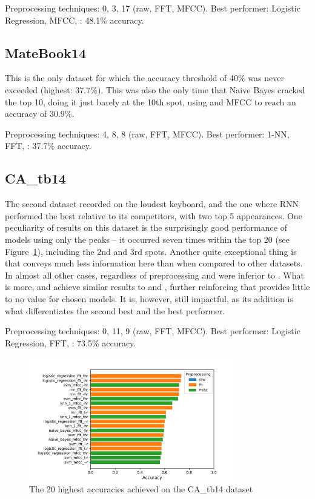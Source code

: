 \documentclass[../main.tex]{subfiles}
\begin{document}
Preprocessing techniques: 0, 3, 17 (raw, FFT, MFCC).
Best performer: Logistic Regression, MFCC, : 48.1\% accuracy.
%
\subsection{MateBook14}
This is the only dataset for which the accuracy threshold of 40\% was never exceeded (highest: 37.7\%).
This was also the only time that Naive Bayes cracked the top 10, doing it just barely at the 10th spot, using  and MFCC to reach an accuracy of 30.9\%. 

Preprocessing techniques: 4, 8, 8 (raw, FFT, MFCC).
Best performer: 1-NN, FFT, : 37.7\% accuracy.
%
\subsection{CA\_tb14}
\label{sec:results_CA_tb14}
The second dataset recorded on the loudest keyboard, and the one where RNN performed the best relative to its competitors, with two top 5 appearances. 
One peculiarity of results on this dataset is the surprisingly good performance of models using only the  peaks -- it occurred seven times within the top 20 (see Figure~\ref{fig:best_acc_per_dataset_CA_tb14}), including the 2nd and 3rd spots. 
Another quite exceptional thing is that  conveys much less information here than when compared to other datasets. In almost all other cases, regardless of preprocessing  and  were inferior to . What is more,  and  achieve similar results to  and , further reinforcing that  provides little to no value for chosen models. 
It is, however, still impactful, as its addition is what differentiates the second best and the best performer. 

Preprocessing techniques: 0, 11, 9 (raw, FFT, MFCC).
Best performer: Logistic Regression, FFT, : 73.5\% accuracy.

\begin{figure}[H]
    \centering
    \includegraphics[width=0.8\textwidth]{figures/plots/best_acc_per_dataset/CA_tb14_dataset.pdf}
    \caption{The 20 highest accuracies achieved on the CA\_tb14 dataset}
    \label{fig:best_acc_per_dataset_CA_tb14}
\end{figure}
\end{document}
